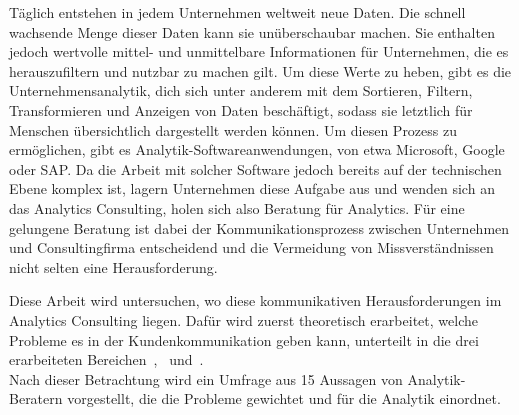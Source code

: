\documentclass[../main.tex]{subfiles}
\begin{document}
Täglich entstehen in jedem Unternehmen weltweit neue Daten.
Die schnell wachsende Menge dieser Daten kann sie unüberschaubar machen.
Sie enthalten jedoch wertvolle mittel- und unmittelbare Informationen für Unternehmen, die es herauszufiltern und nutzbar zu machen gilt.
Um diese Werte zu heben, gibt es die Unternehmensanalytik, dich sich unter anderem mit dem Sortieren, Filtern, Transformieren und Anzeigen von Daten beschäftigt, sodass sie letztlich für Menschen übersichtlich dargestellt werden können.
Um diesen Prozess zu ermöglichen, gibt es Analytik-Softwareanwendungen, von etwa Microsoft, Google oder SAP.\@
Da die Arbeit mit solcher Software jedoch bereits auf der technischen Ebene komplex ist, lagern Unternehmen diese Aufgabe aus und wenden sich an das Analytics Consulting, holen sich also Beratung für Analytics.
Für eine gelungene Beratung ist dabei der Kommunikationsprozess zwischen Unternehmen und Consultingfirma entscheidend und die Vermeidung von Missverständnissen nicht selten eine Herausforderung.
 
Diese Arbeit wird untersuchen, wo diese kommunikativen Herausforderungen im Analytics Consulting liegen.
Dafür wird zuerst theoretisch erarbeitet, welche Probleme es in der Kundenkommunikation geben kann, unterteilt in die drei erarbeiteten Bereichen~,~ und~.
\\
Nach dieser Betrachtung wird ein Umfrage aus 15 Aussagen von Analytik-Beratern vorgestellt, die die Probleme gewichtet und für die Analytik einordnet.
\end{document}
